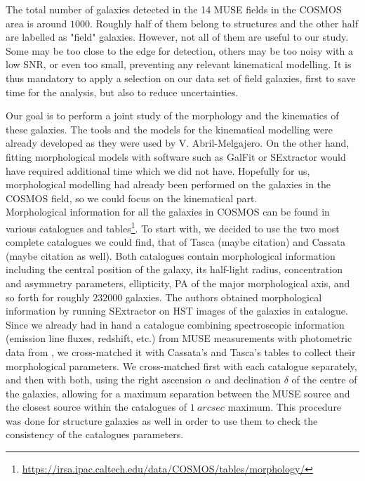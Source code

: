 The total number of galaxies detected in the 14 MUSE fields in the COSMOS area is around $1000$. Roughly half of them belong to structures and the other half are labelled as "field" galaxies. However, not all of them are useful to our study. Some may be too close to the edge for detection, others may be too noisy with a low SNR, or even too small, preventing any relevant kinematical modelling. It is thus mandatory to apply a selection on our data set of field galaxies, first to save time for the analysis, but also to reduce uncertainties.

Our goal is to perform a joint study of the morphology and the kinematics of these galaxies. The tools and the models for the kinematical modelling were already developed as they were used by V. Abril-Melgajero. On the other hand, fitting morphological models with software such as GalFit or SExtractor would have required additional time which we did not have. Hopefully for us, morphological modelling had already been performed on the galaxies in the COSMOS field, so we could focus on the kinematical part. \\

Morphological information for all the galaxies in COSMOS can be found in various catalogues and tables\footnote{\url{https://irsa.ipac.caltech.edu/data/COSMOS/tables/morphology/}}. To start with, we decided to use the two most complete catalogues we could find, that of Tasca (maybe citation) and Cassata (maybe citation as well). Both catalogues contain morphological information including the central position of the galaxy, its half-light radius, concentration and asymmetry parameters, ellipticity, PA of the major morphological axis, and so forth for roughly $232 000$ galaxies. The authors obtained morphological information by running SExtractor on HST images of the galaxies in  catalogue. \\

Since we already had in hand a catalogue combining spectroscopic information (emission line fluxes, redshift, etc.) from MUSE measurements with photometric data from , we cross-matched it with Cassata's and Tasca's tables to collect their morphological parameters. We cross-matched first with each catalogue separately, and then with both, using the right ascension $\alpha$ and declination $\delta$ of the centre of the galaxies, allowing for a maximum separation between the MUSE source and the closest source within the catalogues of $\SI{1}{arcsec}$ maximum. This procedure was done for structure galaxies as well in order to use them to check the consistency of the catalogues parameters.

